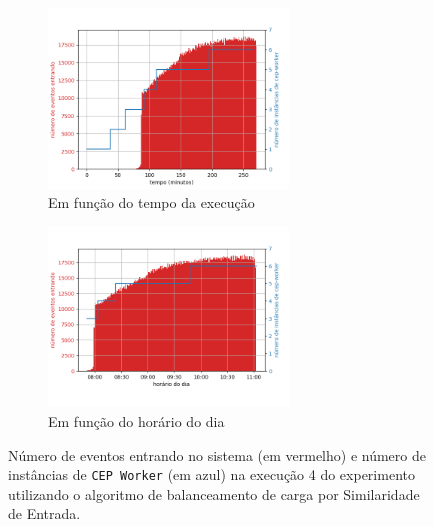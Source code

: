 \begin{figure}[h]
\centering
\begin{subfigure}{\textwidth}
\centering
\includegraphics[width=0.7\textwidth]{figuras/graphics/carga_e_workers_total9-dez-is.png}
\caption{Em função do tempo da execução}
\label{fig:workers_and_load_total-9-dez-is}
\end{subfigure}%

\begin{subfigure}{\textwidth}
\centering
\includegraphics[width=0.7\textwidth]{figuras/graphics/carga_e_workers_horario9-dez-is.png}
\caption{Em função do horário do dia}
\label{fig:workers_and_load_SPtrans-9-dez-is}
\end{subfigure}%
\caption{Número de eventos entrando no sistema (em vermelho) e número de instâncias de \texttt{CEP Worker} (em azul) na execução 4 do experimento utilizando o algoritmo de balanceamento de carga por Similaridade de Entrada.}
\end{figure}








